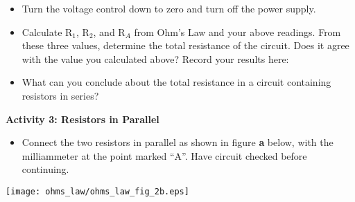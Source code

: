 \begin{itemize}
\item Turn the voltage control down to zero and turn off the power supply.

\item Calculate R\( _{1} \), R\( _{2} \), and R\( _{A} \) from Ohm's Law and 
your above readings. From these three values, determine the total resistance of 
the circuit. Does it agree with the value you calculated above? Record your 
results here:
\vspace{20mm}

\item What can you conclude about the total resistance in a circuit 
containing resistors in series?\vspace{15mm}

\end{itemize}

\pagebreak

\textbf{Activity 3: Resistors in Parallel}

\begin{itemize}
\item Connect the two resistors in parallel as shown in figure \textbf{a} 
below, with the milliammeter at the point marked ``A''. Have circuit checked 
before continuing.
\end{itemize}
\vspace{0.3cm}
\begin{center}
\texttt{[image: ohms\_law/ohms\_law\_fig\_2b.eps]}
\end{center}
\vspace{0.3cm}

